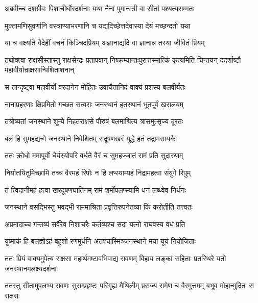 \twolineshloka
{अब्रवीच्च दशग्रीवः पिशाचीर्घोरदर्शनाः}
{यथा नैनां पुमान्स्त्री वा सीतां पश्यत्यसम्मतः} %

\twolineshloka
{मुक्तामणिसुवर्णानि वस्त्राण्याभरणानि च}
{यद्यदिच्छेत्तदेवास्या देयं मच्छन्दतो यथा} %

\twolineshloka
{या च वक्ष्यति वैदेहीं वचनं किञ्चिदप्रियम्}
{अज्ञानाद्यदि वा ज्ञानान्न तस्या जीवितं प्रियम्} %

\threelineshloka
{तथोक्त्वा राक्षसीस्तास्तु राक्षसेन्द्रः प्रतापवान्}
{निष्क्रम्यान्तःपुरात्तस्मात्किं कृत्यमिति चिन्तयन्}
{ददर्शाष्टौ महावीर्यान्राक्षसान्पिशिताशनान्} %

\twolineshloka
{स तान्दृष्ट्वा महावीर्यो वरदानेन मोहितः}
{उवाचैतानिदं वाक्यं प्रशस्य बलवीर्यतः} %

\twolineshloka
{नानाप्रहरणाः क्षिप्रमितो गच्छत सत्वराः}
{जनस्थानं हतस्थानं भूतपूर्वं खरालयम्} %

\twolineshloka
{तत्रोष्यतां जनस्थाने शून्ये निहतराक्षसे}
{पौरुषं बलमाश्रित्य त्रासमुत्सृज्य दूरतः} %

\twolineshloka
{बलं हि सुमहद्यन्मे जनस्थाने निवेशितम्}
{सदूषणखरं युद्धे हतं तद्रामसायकैः} %

\twolineshloka
{ततः क्रोधो ममापूर्वो धैर्यस्योपरि वर्धते}
{वैरं च सुमहज्जातं रामं प्रति सुदारुणम्} %

\twolineshloka
{निर्यातयितुमिच्छामि तच्च वैरमहं रिपोः}
{न हि लप्स्याम्यहं निद्रामहत्वा संयुगे रिपुम्} %

\twolineshloka
{तं त्विदानीमहं हत्वा खरदूषणघातिनम्}
{रामं शर्मोपलप्स्यामि धनं लब्ध्वेव निर्धनः} %

\twolineshloka
{जनस्थाने वसद्भिस्तु भवद्भी राममाश्रिता}
{प्रवृत्तिरुपनेतव्या किं करोतीति तत्त्वतः} %

\twolineshloka
{अप्रमादाच्च गन्तव्यं सर्वैरेव निशाचरैः}
{कर्तव्यश्च सदा यत्नो राघवस्य वधं प्रति} %

\twolineshloka
{युष्माकं हि बलज्ञोऽहं बहुशो रणमूर्धनि}
{अतश्चास्मिञ्जनस्थाने मया यूयं नियोजिताः} %

\fourlineindentedshloka
{ततः प्रियं वाक्यमुपेत्य राक्षसा}
{महार्थमष्टावभिवाद्य रावणम्}
{विहाय लङ्कां सहिताः प्रतस्थिरे}
{यतो जनस्थानमलक्ष्यदर्शनाः} %

\fourlineindentedshloka
{ततस्तु सीतामुपलभ्य रावणः}
{सुसम्प्रहृष्टः परिगृह्य मैथिलीम्}
{प्रसज्य रामेण च वैरमुत्तमम्}
{बभूव मोहान्मुदितः स राक्षसः} %


